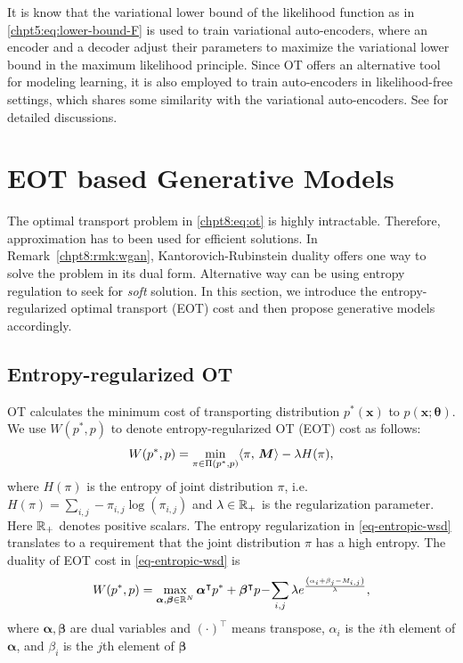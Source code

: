 \begin{remark}
It is know that the variational lower bound of the likelihood function as in \eqref{chpt5:eq:lower-bound-F} is used to train variational auto-encoders, where an encoder and a decoder adjust their parameters to maximize the variational lower bound in the maximum likelihood principle. Since OT offers an alternative tool for modeling learning, it is also employed to train auto-encoders in likelihood-free settings, which shares some similarity with the variational auto-encoders. See \cite{patrini2018sinkhornVAE, genevay2017gan,bousquet2017optimal} for detailed discussions.
\end{remark}

\section{EOT based Generative Models}

The optimal transport problem in \eqref{chpt8:eq:ot} is highly intractable. Therefore, approximation has to been used for efficient solutions. In Remark~\ref{chpt8:rmk:wgan}, Kantorovich-Rubinstein duality offers one way to solve the problem in its dual form. Alternative way can be using entropy regulation to seek for \textit{soft} solution.  In this section, we introduce the entropy-regularized optimal transport (EOT) cost and then propose generative models accordingly.

\subsection{Entropy-regularized OT} 

OT calculates the minimum cost of transporting distribution $p^{\ast}(\bm{x})$ to $p(\bm{x}; \bm{\theta})$. We use $W(p^{\ast},p)$ to denote entropy-regularized OT (EOT) cost as follows:
\begin{equation}\label{eq-entropic-wsd}
  W(p^{\ast},p)=\min_{ \pi \in \Pi(p^{\ast}, p)} \langle \pi,\,\bm{M}\rangle - \lambda H(\pi),
\end{equation}
where $H(\pi)$ is the entropy of joint distribution $\pi$, i.e. $H(\pi) = \sum_{i,j} -\pi_{i,j}
\log(\pi_{i,j})$ and $\lambda \in \mathbb{R}_{+}$ is the regularization
parameter. Here $\mathbb{R}_{+}$ denotes positive scalars. The entropy regularization in \eqref{eq-entropic-wsd}  translates 
to a requirement that the joint distribution $\pi$ has a high entropy. 
 The duality of EOT cost in \eqref{eq-entropic-wsd} is
\begin{equation}\label{eq-dual-wsd}
  W(p^{\ast}, p)  =  \max_{\bm{\al}, \bm{\be} \in \mathbb{R}^{N}} \bm{\al}^{\intercal}p^{\ast} + \bm{\beta}^{\intercal}p \! - \!
  \sum_{i,j} \lambda e^{ \frac{{\left( \al_i + \beta_j - M_{i,j} \right)}}{\la} },\vspace{-2pt}
\end{equation}
where $\bm{\alpha},\bm{\beta}$ are dual variables and $(\cdot)^{\intercal}$ means transpose, $\alpha_i$ is the $i$th element of $\bm{\alpha}$, and $\beta_i$ is the $j$th element of $\bm{\beta}$

